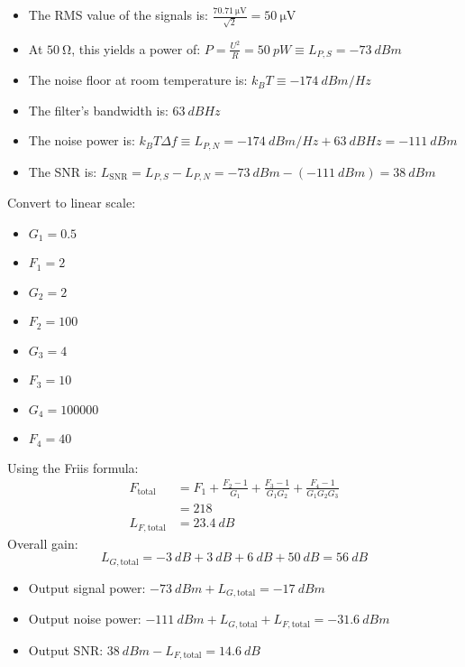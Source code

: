 \begin{solution}
	\begin{tasks}
		\task
		\begin{itemize}
			\item The RMS value of the signals is: $\frac{\SI{70.71}{\micro\volt}}{\sqrt{2}} = \SI{50}{\micro\volt}$
			\item At $\SI{50}{\ohm}$, this yields a power of: $P = \frac{U^2}{R} = \SI{50}{pW} \equiv L_{P,S} = \SI{-73}{dBm}$
			\item The noise floor at room temperature is: $k_B T \equiv \SI{-174}{dBm/Hz}$
			\item The filter's bandwidth is: $\SI{63}{dBHz}$
			\item The noise power is: $k_B T \Delta f \equiv L_{P,N} = \SI{-174}{dBm/Hz} + \SI{63}{dBHz} = \SI{-111}{dBm}$
			\item The SNR is: $L_{\mathrm{SNR}} = L_{P,S} - L_{P,N} = \SI{-73}{dBm} - (\SI{-111}{dBm}) = \SI{38}{dBm}$
		\end{itemize}
	
		\task
		Convert to linear scale:
		\begin{itemize}
			\item $G_1 = 0.5$
			\item $F_1 = 2$
			\item $G_2 = 2$
			\item $F_2 = 100$
			\item $G_3 = 4$
			\item $F_3 = 10$
			\item $G_4 = 100000$
			\item $F_4 = 40$
		\end{itemize}
	
		Using the Friis formula:
		\begin{equation*}
			\begin{split}
				F_{\text{total}} &= F_1 + \frac{F_2 - 1}{G_1} + \frac{F_3 - 1}{G_1 G_2} + \frac{F_4 - 1}{G_1 G_2 G_3} \\
				 &= 218 \\
				L_{F,\text{total}} &= \SI{23.4}{dB}
			\end{split}
		\end{equation*}
		Overall gain:
		\begin{equation*}
			L_{G,\text{total}} = \SI{-3}{dB} + \SI{3}{dB} + \SI{6}{dB} + \SI{50}{dB} = \SI{56}{dB}
		\end{equation*}
		\begin{itemize}
			\item Output signal power: $\SI{-73}{dBm} + L_{G,\text{total}} = \SI{-17}{dBm}$
			\item Output noise power: $\SI{-111}{dBm} + L_{G,\text{total}} + L_{F,\text{total}} = \SI{-31.6}{dBm}$
			\item Output SNR: $\SI{38}{dBm} - L_{F,\text{total}} = \SI{14.6}{dB}$
		\end{itemize}
	

\end{tasks}
\end{solution}
